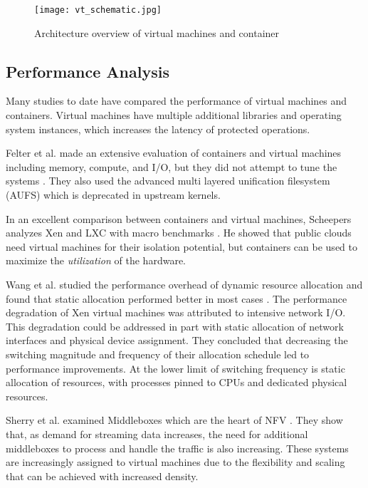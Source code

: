 \begin{figure}
    \centering
    \texttt{[image: vt\_schematic.jpg]}
    \caption{Architecture overview of virtual machines and container}
    \label{fig:vtschematic}
\end{figure}

\subsection{Performance Analysis} %
\label{sub:performanceanalysis}

Many studies to date have compared the performance of virtual machines and containers.
Virtual machines have multiple additional libraries and operating system instances, which increases the latency of protected operations.  

Felter et al. made an extensive evaluation of containers and virtual machines including memory, compute, and I/O, but they did not attempt to tune the systems \autocite{_felter_1}.
They also used the advanced multi layered unification filesystem (AUFS) which is deprecated in upstream kernels.

In an excellent comparison between containers and virtual machines, Scheepers analyzes Xen and LXC with macro benchmarks \autocite{_scheepers_1}.  
He showed that public clouds need virtual machines for their isolation potential, but containers can be used to maximize the \emph{utilization} of the hardware.

Wang et al. studied the performance overhead of dynamic resource allocation and found that static allocation performed better in most cases \autocite{wangAllocation2007}.
The performance degradation of Xen virtual machines was attributed to intensive network I/O.
This degradation could be addressed in part with static allocation of network interfaces and physical device assignment.
They concluded that decreasing the switching magnitude and frequency of their allocation schedule led to performance improvements.
At the lower limit of switching frequency is static allocation of resources, with processes pinned to CPUs and dedicated physical resources.

Sherry et al. examined Middleboxes which are the heart of NFV \autocite{sherry2012making}.
They show that, as demand for streaming data increases, the need for additional middleboxes to process and handle the traffic is also increasing.
These systems are increasingly assigned to virtual machines due to the flexibility and scaling that can be achieved with increased density.

